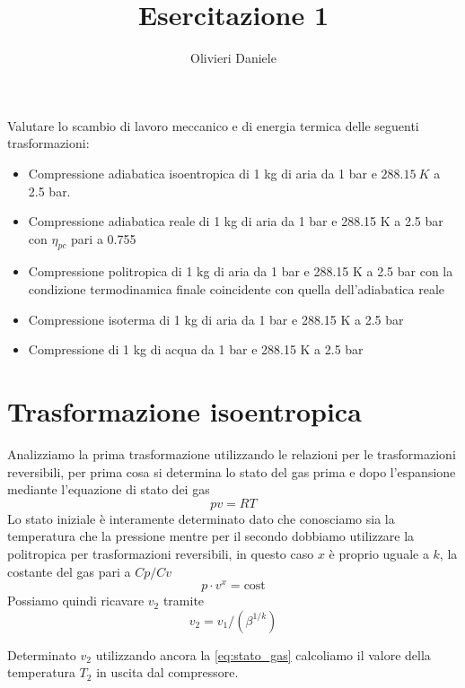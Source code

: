 \documentclass[a4paper,12pt]{article}
\title{Esercitazione 1}
\author{Olivieri Daniele}
\date{}
\begin{document}
\maketitle
Valutare lo scambio di lavoro meccanico e di energia termica
delle seguenti trasformazioni:
\begin{itemize}
    \item Compressione adiabatica isoentropica di 1 kg di aria da
    1 bar e $288.15\ K$ a 2.5 bar.
    
    \item Compressione adiabatica reale di 1 kg di aria da 1 bar
    e 288.15 K a 2.5 bar con $\eta_{pc}$ pari a 0.755
   
    \item Compressione politropica di 1 kg di aria da 1 bar e 288.15 K a 2.5 bar
    con la condizione termodinamica finale coincidente con quella dell'adiabatica reale
   
    \item Compressione isoterma di 1 kg di aria da 1 bar e 288.15 K a 2.5 bar

    \item Compressione di 1 kg di acqua da 1 bar e 288.15 K a 2.5 bar
\end{itemize}

\section{Trasformazione isoentropica}
\label{sec:prima_trasformazione}
Analizziamo la prima trasformazione utilizzando le relazioni per le trasformazioni reversibili,
per prima cosa si determina lo stato del gas prima e dopo l'espansione mediante l'equazione
di stato dei gas
\begin{equation}
    \label{eq:stato_gas}
    pv = RT
\end{equation}
Lo stato iniziale è interamente determinato dato che conosciamo sia la temperatura che la pressione
mentre per il secondo dobbiamo utilizzare la politropica per trasformazioni reversibili,
in questo caso $x$ è proprio uguale a $k$, la costante del gas pari a $Cp/Cv$
\begin{equation}
    \label{eq:politropica}
    p\cdot v^x=\text{cost}
\end{equation}
Possiamo quindi ricavare $v_2$ tramite $$  v_2 = v_1/(\beta^{1/k}) $$

Determinato $v_2$ utilizzando ancora la \eqref{eq:stato_gas} calcoliamo il valore della temperatura
$T_2$ in uscita dal compressore.
\end{document}
